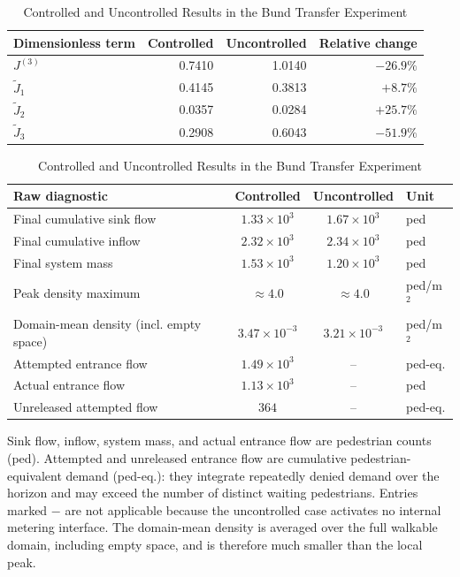 \documentclass[lettersize,journal]{IEEEtran}
\begin{document}
\begin{table}[!t]
\centering
\caption{Controlled and Uncontrolled Results in the Bund Transfer Experiment}
\label{tab:bund_transfer_metrics}
\footnotesize
\setlength{\tabcolsep}{2pt}
\begin{tabular}{@{}>{\raggedright\arraybackslash}p{}r r r@{}}
\hline
Dimensionless term & Controlled & Uncontrolled & Relative change \\
\hline
$J^{(3)}$ & 0.7410 & 1.0140 & $-26.9\%$ \\
$\tilde J_1$ & 0.4145 & 0.3813 & $+8.7\%$ \\
$\tilde J_2$ & 0.0357 & 0.0284 & $+25.7\%$ \\
$\tilde J_3$ & 0.2908 & 0.6043 & $-51.9\%$ \\
\hline
\end{tabular}

\vspace{1.5mm}
\begin{tabular}{@{}>{\raggedright\arraybackslash}p{}c c l@{}}
\hline
Raw diagnostic & Controlled & Uncontrolled & Unit \\
\hline
Final cumulative sink flow & $1.33{\times}10^3$ & $1.67{\times}10^3$ & ped \\
Final cumulative inflow & $2.32{\times}10^3$ & $2.34{\times}10^3$ & ped \\
Final system mass & $1.53{\times}10^3$ & $1.20{\times}10^3$ & ped \\
Peak density maximum & $\approx 4.0$ & $\approx 4.0$ & ped/m$^2$ \\
Domain-mean density (incl. empty space) & $3.47{\times}10^{-3}$ & $3.21{\times}10^{-3}$ & ped/m$^2$ \\
Attempted entrance flow & $1.49{\times}10^3$ & \multicolumn{1}{c}{--} & ped-eq. \\
Actual entrance flow & $1.13{\times}10^3$ & \multicolumn{1}{c}{--} & ped \\
Unreleased attempted flow & $364$ & \multicolumn{1}{c}{--} & ped-eq. \\
\hline
\end{tabular}

\par\vspace{3.5mm}
\noindent\parbox{\columnwidth}{\footnotesize Sink flow, inflow, system mass, and actual entrance flow are pedestrian counts (ped). Attempted and unreleased entrance flow are cumulative pedestrian-equivalent demand (ped-eq.): they integrate repeatedly denied demand over the horizon and may exceed the number of distinct waiting pedestrians. Entries marked $-$ are not applicable because the uncontrolled case activates no internal metering interface. The domain-mean density is averaged over the full walkable domain, including empty space, and is therefore much smaller than the local peak.}
\end{table}
\end{document}
